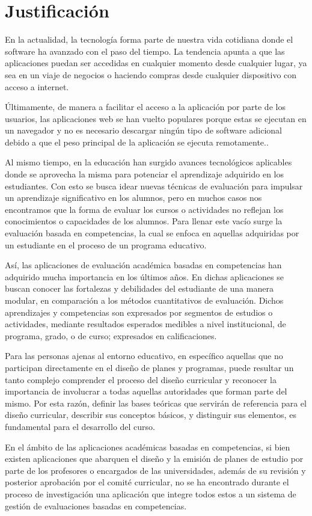 \section{Justificación}
En la actualidad, la tecnología forma parte de nuestra vida cotidiana donde el software ha avanzado con el paso del tiempo. La tendencia apunta a que las aplicaciones puedan ser accedidas en cualquier momento desde cualquier lugar, ya sea en un viaje de negocios o haciendo compras desde cualquier dispositivo con acceso a internet. 

Últimamente, de manera a facilitar el acceso a la aplicación por parte de los usuarios, las aplicaciones web se han vuelto populares porque estas se ejecutan en un navegador y no es necesario descargar ningún tipo de software adicional debido a que el peso principal de la aplicación se ejecuta remotamente.\citep{net_app_architecture}.

Al mismo tiempo, en la educación han surgido avances tecnológicos aplicables donde se aprovecha la misma para potenciar el aprendizaje adquirido en los estudiantes. Con esto se busca idear nuevas técnicas de evaluación para impulsar un aprendizaje significativo en los alumnos, pero en muchos casos nos encontramos que la forma de evaluar los cursos o actividades no reflejan los conocimientos o capacidades de los alumnos. Para llenar este vacío surge la evaluación basada en competencias, la cual se enfoca en aquellas adquiridas por un estudiante en el proceso de un programa educativo\citep{kuh_knowing_2014}.  

Así, las aplicaciones de evaluación académica basadas en competencias han adquirido mucha importancia en los últimos años\citep{kuh_knowing_2014}. En dichas aplicaciones se buscan conocer las fortalezas y debilidades del estudiante de una manera modular, en comparación a los métodos cuantitativos de evaluación. Dichos aprendizajes y competencias son expresados por segmentos de estudios o actividades, mediante resultados esperados medibles a nivel institucional, de programa, grado, o de curso; expresados en calificaciones\citep{kuh_using_2015}.

Para las personas ajenas al entorno educativo, en específico aquellas que no participan directamente en el diseño de planes y programas, puede resultar un tanto complejo comprender el proceso del diseño curricular y reconocer la importancia de involucrar a todas aquellas autoridades que forman parte del mismo. Por esta razón, definir las bases teóricas que servirán de referencia para el diseño curricular, describir sus conceptos básicos, y distinguir sus elementos, es fundamental para el desarrollo del curso\citep{boyle_curriculum_2016}.

En el ámbito de las aplicaciones académicas basadas en competencias, si bien existen aplicaciones que abarquen el diseño y la emisión de planes de estudio por parte de los profesores o encargados de las universidades, además de su revisión y posterior aprobación por el comité curricular, no se ha encontrado durante el proceso de investigación una aplicación que integre todos estos a un sistema de gestión de evaluaciones basadas en competencias.
